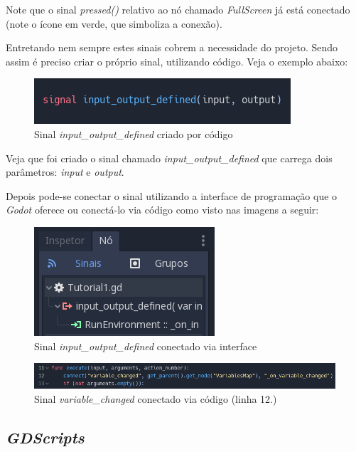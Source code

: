 Note que o sinal \textit{pressed()} relativo ao nó chamado \textit{FullScreen} 
já está conectado (note o ícone em verde, que simboliza a conexão).

Entretando nem sempre estes sinais cobrem a necessidade do projeto. Sendo assim
é preciso criar o próprio sinal, utilizando código. Veja o exemplo abaixo:

\begin{figure}[H]
    \includegraphics[scale=0.6]{../figuras/criando_sinal_via_codigo.png}
    \caption{Sinal \textit{input\_output\_defined} criado por código}
\end{figure}

Veja que foi criado o sinal chamado \textit{input\_output\_defined} que
carrega dois parâmetros: \textit{input} e \textit{output}. 

Depois pode-se conectar o sinal utilizando a interface de programação
que o \textit{Godot} oferece ou conectá-lo via código como visto nas imagens
a seguir:

\begin{figure}[H]
    \includegraphics[scale=0.8]{../figuras/sinal_conectado_interface.png}
    \caption{Sinal \textit{input\_output\_defined} conectado via interface}
\end{figure}

\begin{figure}[H]
      \includegraphics[width=\textwidth]{../figuras/sinal_conectado_codigo.png}
      \caption{Sinal \textit{variable\_changed} conectado via código (linha 12.)}
\end{figure}

\subsection{\textit{GDScripts}}

